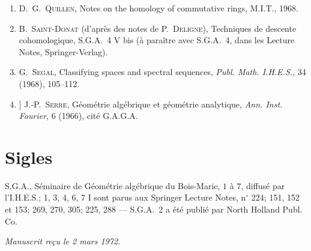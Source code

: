 \documentclass[12pt,a4paper]{amsart}
\theoremstyle{plain}
\theoremstyle{definition}
\theoremstyle{remark}
\numberwithin{equation}{section}
\begin{document}
\begin{enumerate}
\item[{[12]}] D.~G.~\textsc{Quillen}, Notes on the homology of commutative rings, M.I.T., 1968.

\item[{[13]}] B.~\textsc{Saint-Donat} (d'après des notes de P.~\textsc{Deligne}), Techniques de descente cohomologique, S.G.A.~4 V bis (à paraître avec S.G.A.~4, dans les Lecture Notes, Springer-Verlag).

\item[{[14]}] G.~\textsc{Segal}, Classifying spaces and spectral sequences, \textit{Publ. Math. I.H.E.S.}, 34 (1968), 105--112.

\item[{[$\mathrm{GAGA}$}]] J.-P.~\textsc{Serre}, Géométrie algébrique et géométrie analytique, \textit{Ann. Inst. Fourier}, 6 (1966), cité G.A.G.A.
\end{enumerate}

\section*{Sigles}

S.G.A., Séminaire de Géométrie algébrique du Bois-Marie, $1$ à $7$, diffusé par l'I.H.E.S.; 1, 3, 4, 6, 7 I sont parus aux Springer Lecture Notes, n$^\circ$ 224; 151, 152 et 153; 269, 270, 305; 225, 288 --- S.G.A.~2 a été publié par North Holland Publ. Co.

\vspace{1cm}
\begin{flushright}
\textit{Manuscrit reçu le 2 mars 1972.}
\end{flushright}
\end{document}
